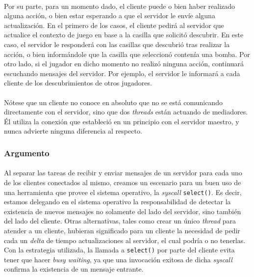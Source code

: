 \documentclass[spanish]{article}
\begin{document}
\paragraph{} Por su parte, para un momento dado, el cliente puede o bien haber realizado alguna acción, o bien estar esperando a que el servidor le envíe alguna actualización. En el primero de los casos, el cliente pedirá al servidor que actualice el contexto de juego en base a la casilla que solicitó descubrir. En este caso, el servidor le responderá con las casillas que descubrió tras realizar la acción, o bien informándole que la casilla que seleccionó contenía una bomba. Por otro lado, si el jugador en dicho momento no realizó ninguna acción, continuará escuchando mensajes del servidor. Por ejemplo, el servidor le informará a cada cliente de los descubrimientos de otros jugadores.
\paragraph{} Nótese que un cliente no conoce en absoluto que no se está comunicando directamente con el servidor, sino que dos \textit{threads} están actuando de mediadores. Él utiliza la conexión que estableció en un principio con el servidor maestro, y nunca advierte ninguna diferencia al respecto.
\subsubsection{Argumento}
\paragraph{} Al separar las tareas de recibir y enviar mensajes de un servidor para cada uno de los clientes conectados al mismo, creamos un escenario para un buen uso de una herramienta que provee el sistema operativo, la \textit{syscall} \verb|select()|. Es decir, estamos delegando en el sistema operativo la responsabilidad de detectar la existencia de nuevos mensajes no solamente del lado del servidor, sino también del lado del cliente. Otras alternativas, tales como crear un único \textit{thread} para atender a un cliente, hubieran significado para un cliente la necesidad de pedir cada un \textit{delta} de tiempo actualizaciones al servidor, el cual podría o no tenerlas. Con la estrategia utilizada, la llamada a \verb|select()| por parte del cliente evita tener que hacer \textit{busy waiting}, ya que una invocación exitosa de dicha \textit{syscall} confirma la existencia de un mensaje entrante.
\end{document}
